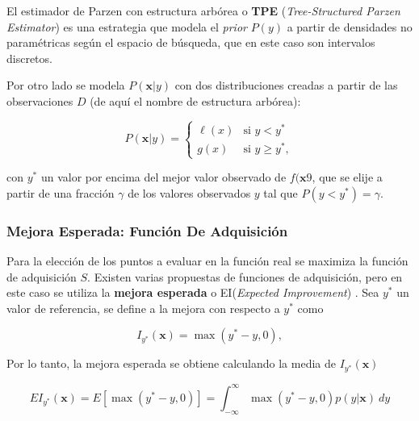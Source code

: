  
 El estimador de Parzen con estructura arbórea o \textbf{TPE} (\textit{Tree-Structured Parzen Estimator}) \cite{NIPS2011_86e8f7ab} es una estrategia que modela el \textit{prior} $P(y)$ a partir de densidades no paramétricas según el espacio de búsqueda, que en este caso son intervalos discretos. 
 
Por otro lado se modela $P(\textbf{x}|y)$ con dos distribuciones creadas a partir de las observaciones $D$ (de aquí el nombre de estructura arbórea):

\begin{equation}
P(\textbf{x}|y) =
	\begin{cases}
		\ell (x) & \text{si } y <y^{*} \\
		g(x) & \text{si } y \geq y^{*},
	\end{cases}
\end{equation}

con $y^{*}$ un valor por encima del mejor valor observado de $f(\textbf{x}9$, que se elije a partir de una fracción $\gamma$ de los valores observados $y$ tal que $P(y<y^{*}) = \gamma$.
 
\subsubsection*{Mejora Esperada: Función De Adquisición} 
 
Para la elección de los puntos a evaluar en la función real se maximiza la función de adquisición $S$. Existen varias propuestas de funciones de adquisición, pero en este caso se utiliza la \textbf{mejora esperada} o EI(\textit{Expected Improvement}) \cite{EI1}. Sea $y^*$ un valor de referencia, se define a la mejora con respecto a $y^*$ como

\begin{equation}
I_{y^*}(\textbf{x}) = \max(y^*-y,0),
\end{equation}

Por lo tanto, la mejora esperada se obtiene calculando la media de $I_{y^*}(\textbf{x})$

\begin{equation}
EI_{y^*}(\textbf{x}) = E[\max(y^*-y,0)]= \int_{-\infty}^{\infty} \max(y^*-y,0) p(y|\textbf{x}) \ dy
\end{equation}
 
